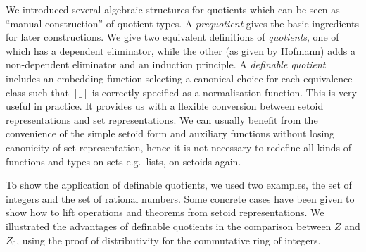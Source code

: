 We introduced several
algebraic structures for quotients which can be seen as ``manual construction'' of quotient types.
A \emph{prequotient} gives the basic ingredients for later
constructions. We give two equivalent definitions of \emph{quotients},
one of which has a dependent eliminator, while the other (as given by Hofmann) adds
 a non-dependent eliminator and an induction principle.
A \emph{definable quotient} includes an embedding function selecting a canonical choice for each
equivalence class such that $[\_]$ is correctly specified as a normalisation function. 
This is very useful in practice.
It provides us with a flexible conversion between setoid representations and set representations.
We can usually benefit from the convenience of the simple setoid form and auxiliary functions without losing canonicity of set representation, hence it is not necessary to redefine all kinds of functions and types on sets e.g.\ lists, on setoids again.

To show the application of definable quotients, we
used two examples, the set of integers and the set of rational
numbers. Some concrete cases have been given to show how to lift operations and theorems from setoid representations.
We illustrated the advantages of definable quotients in the comparison between $Z$ and $Z_0$, using the proof of distributivity for the commutative ring of integers.




